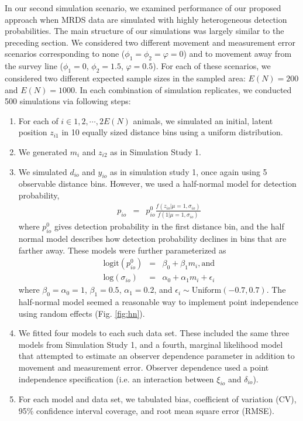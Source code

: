 \documentclass[12pt,fleqn]{article}
\begin{document}
In our second simulation scenario, we examined performance of our proposed approach when MRDS data are simulated with highly heterogeneous detection probabilities.  The main structure of our simulations was largely similar to the preceding section.  We considered two different movement and measurement error scenarios corresponding to none ($\phi_1=\phi_2=\varphi=0$) and to movement away from the survey line ($\phi_1=0$, $\phi_2=1.5$, $\varphi=0.5$). For each of these scenarios, we considered two different expected sample sizes in the sampled area: $E(N) = 200$ and $E(N)=1000$.  In each combination of simulation replicates, we conducted 500 simulations via following steps:
\begin{enumerate}
  \item For each of $i \in 1,2,\cdots,2E(N)$ animals, we simulated an initial, latent position $z_{i1}$ in 10 equally sized distance bins using a uniform distribution.
  \item We generated $m_i$ and $z_{i2}$ as in Simulation Study 1.
  \item We simulated $d_{io}$ and $y_{io}$ as in simulation study 1, once again using 5 observable distance bins. However, we used a half-normal model for detection probability,
      \begin{eqnarray*}
        p_{io} & = & p_{io}^0 \frac{f(z_{io}|\mu=1,\sigma_{io})}{f(1|\mu=1,\sigma_{io})}
      \end{eqnarray*}
      where $p_{io}^0$ gives detection probability in the first distance bin, and the half normal model describes how detection probability declines in bins that are farther away. These models were further parameterized as
      \begin{eqnarray*}
        \text{logit}(p_{io}^0) & = & \beta_0 + \beta_1 m_i, \text{and} \\
        \text{log}(\sigma_{io}) & = & \alpha_0 + \alpha_1 m_i + \epsilon_i
      \end{eqnarray*}
      where $\beta_0 = \alpha_0 = 1$, $\beta_1 = 0.5$, $\alpha_1 = 0.2$, and $\epsilon_i \sim \text{Uniform}(-0.7,0.7)$.  The half-normal model seemed a reasonable way to implement point independence \citep{LaakeBorchers2004} using random effects (Fig. \ref{fig:hn}).
  \item We fitted four models to each such data set.  These included the same three models from Simulation Study 1, and a fourth, marginal likelihood model that attempted to estimate an observer dependence parameter in addition to movement and measurement error.  Observer dependence used a point independence specification (i.e. an interaction between $\xi_{io}$ and $\delta_{io}$). \\
  \item For each model and data set, we tabulated bias, coefficient of variation (CV), 95\% confidence interval coverage, and root mean square error (RMSE).
\end{enumerate}
\end{document}
